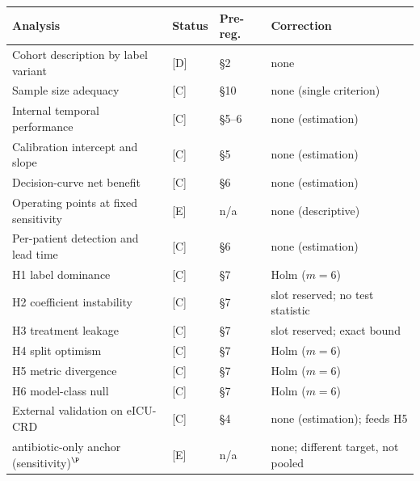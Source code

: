 \begin{table}[H]
    \centering\footnotesize\setlength{\tabcolsep}{4pt}
    \begin{tabular}{p{5.0cm}lp{1.9cm}p{4.2cm}}
        \toprule
        \textbf{Analysis} & \textbf{Status} & \textbf{Pre-reg.}
        & \textbf{Correction} \\
        \midrule
        Cohort description by label variant       & [D] & \S2     & none                                   \\
        Sample size adequacy                      & [C] & \S10    & none (single criterion)                \\
        Internal temporal performance             & [C] & \S5--6  & none (estimation)                      \\
        Calibration intercept and slope           & [C] & \S5     & none (estimation)                      \\
        Decision-curve net benefit                & [C] & \S6     & none (estimation)                      \\
        Operating points at fixed sensitivity     & [E] & n/a     & none (descriptive)                     \\
        Per-patient detection and lead time       & [C] & \S6     & none (estimation)                      \\
        H1 label dominance                        & [C] & \S7     & Holm ($m=6$)                           \\
        H2 coefficient instability                & [C] & \S7     & slot reserved; no test statistic       \\
        H3 treatment leakage                      & [C] & \S7     & slot reserved; exact bound             \\
        H4 split optimism                         & [C] & \S7     & Holm ($m=6$)                           \\
        H5 metric divergence                      & [C] & \S7     & Holm ($m=6$)                           \\
        H6 model-class null                       & [C] & \S7     & Holm ($m=6$)                           \\
        External validation on eICU-CRD           & [C] & \S4     & none (estimation); feeds H5            \\
        \quad antibiotic-only anchor (sensitivity)$^\P$ & [E] & n/a     & none; different target, not pooled \\

\end{tabular}
\end{table}

